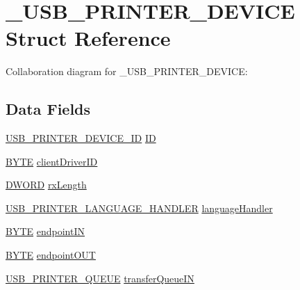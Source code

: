 \hypertarget{struct___u_s_b___p_r_i_n_t_e_r___d_e_v_i_c_e}{}\section{\+\_\+\+U\+S\+B\+\_\+\+P\+R\+I\+N\+T\+E\+R\+\_\+\+D\+E\+V\+I\+C\+E Struct Reference}
\label{struct___u_s_b___p_r_i_n_t_e_r___d_e_v_i_c_e}


Collaboration diagram for \+\_\+\+U\+S\+B\+\_\+\+P\+R\+I\+N\+T\+E\+R\+\_\+\+D\+E\+V\+I\+C\+E\+:
\subsection*{Data Fields}
\begin{DoxyCompactItemize}
\item 
\hyperlink{usb__host__printer_8h_acc6ade4e12b3e7bd440550fefe53bf5d}{U\+S\+B\+\_\+\+P\+R\+I\+N\+T\+E\+R\+\_\+\+D\+E\+V\+I\+C\+E\+\_\+\+I\+D} \hyperlink{struct___u_s_b___p_r_i_n_t_e_r___d_e_v_i_c_e_a4f6763f7bce639ef99e4d1c97868f3c1}{I\+D}
\item 
\hyperlink{_generic_type_defs_8h_a4ae1dab0fb4b072a66584546209e7d58}{B\+Y\+T\+E} \hyperlink{struct___u_s_b___p_r_i_n_t_e_r___d_e_v_i_c_e_a343912ad63712ea60903f5acd92efc9e}{client\+Driver\+I\+D}
\item 
\hyperlink{_generic_type_defs_8h_ad342ac907eb044443153a22f964bf0af}{D\+W\+O\+R\+D} \hyperlink{struct___u_s_b___p_r_i_n_t_e_r___d_e_v_i_c_e_adbfee033e0e7e622d10ed76dab623197}{rx\+Length}
\item 
\hyperlink{usb__host__printer_8h_a386c8d36e894c3aaee8d1ec1802652d9}{U\+S\+B\+\_\+\+P\+R\+I\+N\+T\+E\+R\+\_\+\+L\+A\+N\+G\+U\+A\+G\+E\+\_\+\+H\+A\+N\+D\+L\+E\+R} \hyperlink{struct___u_s_b___p_r_i_n_t_e_r___d_e_v_i_c_e_a6ed5a66e70c00fcaa1d6209bb6a97b42}{language\+Handler}
\item 
\hyperlink{_generic_type_defs_8h_a4ae1dab0fb4b072a66584546209e7d58}{B\+Y\+T\+E} \hyperlink{struct___u_s_b___p_r_i_n_t_e_r___d_e_v_i_c_e_a7315b8753e0b037bc146e042802ebb68}{endpoint\+I\+N}
\item 
\hyperlink{_generic_type_defs_8h_a4ae1dab0fb4b072a66584546209e7d58}{B\+Y\+T\+E} \hyperlink{struct___u_s_b___p_r_i_n_t_e_r___d_e_v_i_c_e_af9c36438db4920f863a43c2662548c47}{endpoint\+O\+U\+T}
\item 
\hyperlink{usb__host__printer_8c_a502fc71b78efb6ff7757de1547b58895}{U\+S\+B\+\_\+\+P\+R\+I\+N\+T\+E\+R\+\_\+\+Q\+U\+E\+U\+E} \hyperlink{struct___u_s_b___p_r_i_n_t_e_r___d_e_v_i_c_e_abe803a2d9751c2b64842778630d13f06}{transfer\+Queue\+I\+N}

\end{DoxyCompactItemize}
